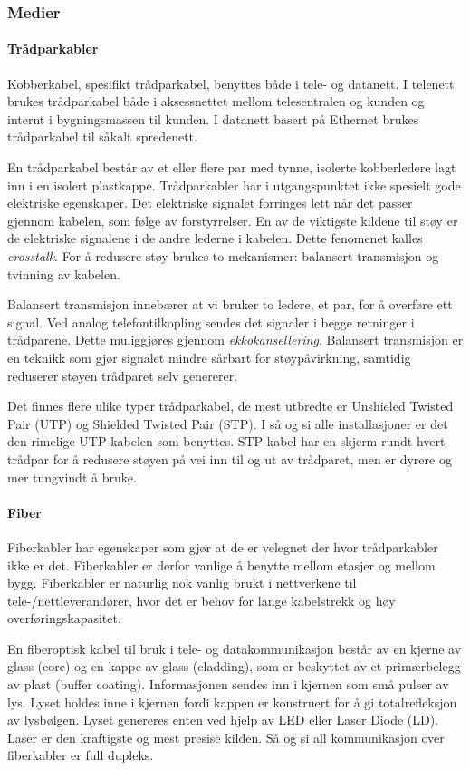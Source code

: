 \documentclass[11pt,a4paper]{article}
\begin{document}
\subsubsection{Medier}
\paragraph{Trådparkabler}
Kobberkabel, spesifikt trådparkabel, benyttes både i tele- og datanett. I telenett brukes trådparkabel både i aksessnettet mellom telesentralen og kunden og internt i bygningsmassen til kunden. I datanett basert på Ethernet brukes trådparkabel til såkalt spredenett.

En trådparkabel består av et eller flere par med tynne, isolerte kobberledere lagt inn i en isolert plastkappe. Trådparkabler har i utgangspunktet ikke spesielt gode elektriske egenskaper. Det elektriske signalet forringes lett når det passer gjennom kabelen, som følge av forstyrrelser. En av de viktigste kildene til støy er de elektriske signalene i de andre lederne i kabelen. Dette fenomenet kalles \textit{crosstalk}. For å redusere støy brukes to mekanismer: balansert transmisjon og tvinning av kabelen.

Balansert transmisjon innebærer at vi bruker to ledere, et par, for å overføre ett signal. Ved analog telefontilkopling sendes det signaler i begge retninger i trådparene. Dette muliggjøres gjennom \textit{ekkokansellering}. 
Balansert transmisjon er en teknikk som gjør signalet mindre sårbart for støypåvirkning, samtidig reduserer støyen trådparet selv genererer.

Det finnes flere ulike typer trådparkabel, de mest utbredte er Unshieled Twisted Pair (UTP) og Shielded Twisted Pair (STP). I så og si alle installasjoner er det den rimelige UTP-kabelen som benyttes. STP-kabel har en skjerm rundt hvert trådpar for å redusere støyen på vei inn til og ut av trådparet, men er dyrere og mer tungvindt å bruke.

\paragraph{Fiber}
Fiberkabler har egenskaper som gjør at de er velegnet der hvor trådparkabler ikke er det. Fiberkabler er derfor vanlige å benytte mellom etasjer og mellom bygg. Fiberkabler er naturlig nok vanlig brukt i nettverkene til tele-/nettleverandører, hvor det er behov for lange kabelstrekk og høy overføringskapasitet.

En fiberoptisk kabel til bruk i tele- og datakommunikasjon består av en kjerne av glass (core) og en kappe av glass (cladding), som er beskyttet av et primærbelegg av plast (buffer coating). Informasjonen sendes inn i kjernen som små pulser av lys. Lyset holdes inne i kjernen fordi kappen er konstruert for å gi totalrefleksjon av lysbølgen. Lyset genereres enten ved hjelp av LED eller Laser Diode (LD). Laser er den kraftigste og mest presise kilden. Så og si all kommunikasjon over fiberkabler er full dupleks.
\end{document}

